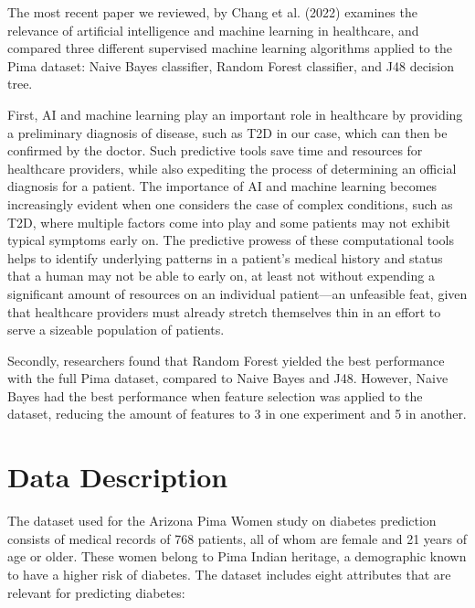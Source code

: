 \documentclass[journal]{IEEEtran}
\begin{document}
The most recent paper we reviewed, by Chang et al. (2022) examines the relevance of artificial intelligence and machine learning in healthcare, and compared three different supervised machine learning algorithms applied to the Pima dataset: Naive Bayes classifier, Random Forest classifier, and J48 decision tree. 

First, AI and machine learning play an important role in healthcare by providing a preliminary diagnosis of disease, such as T2D in our case, which can then be confirmed by the doctor. Such predictive tools save time and resources for healthcare providers, while also expediting the process of determining an official diagnosis for a patient. The importance of AI and machine learning becomes increasingly evident when one considers the case of complex conditions, such as T2D, where multiple factors come into play and some patients may not exhibit typical symptoms early on. The predictive prowess of these computational tools helps to identify underlying patterns in a patient's medical history and status that a human may not be able to early on, at least not without expending a significant amount of resources on an individual patient—an unfeasible feat, given that healthcare providers must already stretch themselves thin in an effort to serve a sizeable population of patients. 

Secondly, researchers found that Random Forest yielded the best performance with the full Pima dataset, compared to Naive Bayes and J48. However, Naive Bayes had the best performance when feature selection was applied to the dataset, reducing the amount of features to 3 in one experiment and 5 in another.
\\

\section{Data Description}
The dataset used for the Arizona Pima Women study on diabetes prediction consists of medical records of 768 patients, all of whom are female and 21 years of age or older. These women belong to Pima Indian heritage, a demographic known to have a higher risk of diabetes. The dataset includes eight attributes that are relevant for predicting diabetes:
\end{document}
